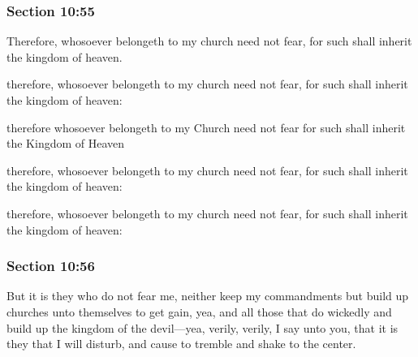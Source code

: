 	\subsubsection{Section 10:55} %
		\label{DC10-55}

		Therefore, whosoever belongeth to my church need not fear, for such shall inherit the kingdom of heaven.

		\begin{framed}
		\scriptsize
			\begin{compactdesc}
				\item[JSP] therefore, whosoever belongeth to my church need not fear, for such shall inherit the kingdom of heaven:
				\item[RB1] therefore whosoever belongeth to my Church need not fear for such shall inherit the Kingdom of Heaven
				\item[DC 1835] therefore, whosoever belongeth to my church need not fear, for such shall inherit the kingdom of heaven:
				\item[DC 1844] therefore, whosoever belongeth to my church need not fear, for such shall inherit the kingdom of heaven:
			\end{compactdesc}
		\end{framed}

	\subsubsection{Section 10:56} %
		\label{DC10-56}

		But it is they who do not fear me, neither keep my commandments but build up churches unto themselves to get gain, yea, and all those that do wickedly and build up the kingdom of the devil---yea, verily, verily, I say unto you, that it is they that I will disturb, and cause to tremble and shake to the center.

